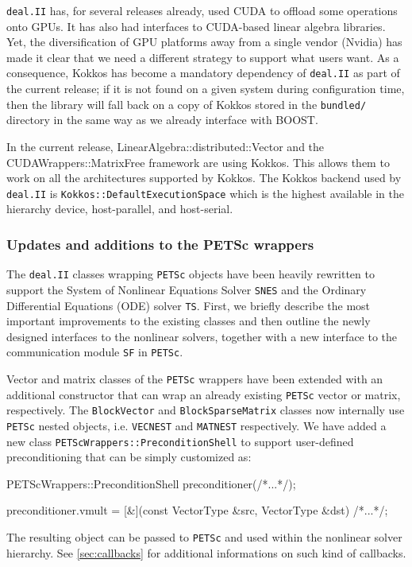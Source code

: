 \documentclass{ansarticle-preprint}
\newcommand{\specialword}[1]{\texttt{#1}}
\newcommand{\dealii}{{\specialword{deal.II}}\xspace}
\newcommand{\petsc}{\specialword{PETSc}\xspace}
\newcommand{\snes}{{\specialword{SNES}}\xspace}
\newcommand{\ts}{{\specialword{TS}}\xspace}
\newcommand{\petscsf}{{\specialword{SF}}\xspace}
\begin{document}
\dealii{} has, for several releases already, used CUDA to offload some
operations onto GPUs. It has also had interfaces to CUDA-based linear
algebra libraries. Yet, the diversification of GPU platforms away from
a single vendor (Nvidia) has made it clear that we need a different
strategy to support what users want. As a consequence, Kokkos has
become a mandatory dependency of \dealii{} as part of the current
release; if it is not found on a given system during configuration
time, then the library will fall back on a copy of Kokkos stored in
the \texttt{bundled/} directory in the same way as we already
interface with BOOST.

In the current release, LinearAlgebra::distributed::Vector and the
CUDAWrappers::MatrixFree framework are using Kokkos. This allows them to work on
all the architectures supported by Kokkos. The Kokkos backend used by \dealii is
\texttt{Kokkos::DefaultExecutionSpace} which is the highest available in the hierarchy
device, host-parallel, and host-serial.



\subsubsection{Updates and additions to the PETSc wrappers}\label{sec:petsc}

The \dealii classes wrapping \petsc objects have been heavily rewritten
to support the System of Nonlinear Equations Solver \snes and the Ordinary Differential Equations (ODE)
solver \ts \cite{abhyankar2018petsc}.
First, we briefly describe the most important improvements to the existing
classes and then outline the newly designed interfaces to the nonlinear solvers, together
with a new interface to the communication module \petscsf in \petsc \cite{zhang2021petscsf}.

Vector and matrix classes of the \petsc wrappers have been extended with an additional constructor
that can wrap an already existing \petsc vector or matrix, respectively.
The \texttt{BlockVector} and
\texttt{BlockSparseMatrix} classes now internally use
\petsc nested objects, i.e. \texttt{VECNEST} and  \texttt{MATNEST} respectively.
We have added a new class \texttt{PETScWrappers::PreconditionShell} to support user-defined
preconditioning that can be simply customized as:
\begin{c++}
PETScWrappers::PreconditionShell preconditioner(/*...*/);

preconditioner.vmult = [&](const VectorType &src,
                           VectorType       &dst) {/*...*/};

\end{c++}
The resulting object can be passed to \petsc and used within the nonlinear solver hierarchy.
See \ref{sec:callbacks} for additional informations on such kind of callbacks.
\end{document}

